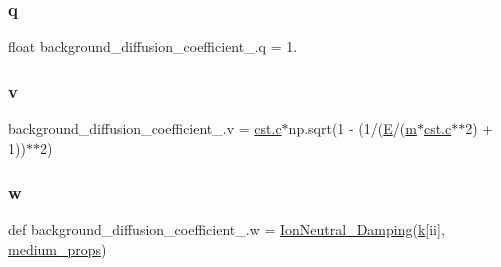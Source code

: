 \mbox{\label{namespacebackground__diffusion__coefficient__2_a7bd6101496be3edb3360a74d65a9798f}} 
\subsubsection{\texorpdfstring{q}{q}}
{\footnotesize\ttfamily float background\+\_\+diffusion\+\_\+coefficient\+\_.\+q = 1.}

\mbox{\label{namespacebackground__diffusion__coefficient__2_a154af3df854c757afad8e3f28b2fc75f}} 
\subsubsection{\texorpdfstring{v}{v}}
{\footnotesize\ttfamily background\+\_\+diffusion\+\_\+coefficient\+\_.\+v = \hyperlink{constants_8h_a8fc6defe4e499b1b9b9c275689e44352}{cst.\+c}$\ast$np.\+sqrt(1 -\/ (1/(\hyperlink{namespacebackground__diffusion__coefficient__2_aa9d61d39948704c32b87737a21272c27}{E}/(\hyperlink{namespacebackground__diffusion__coefficient__2_ab368f7ba91e714aac6f5c675e2a2534f}{m}$\ast$\hyperlink{constants_8h_a8fc6defe4e499b1b9b9c275689e44352}{cst.\+c}$\ast$$\ast$2) + 1))$\ast$$\ast$2)}

\mbox{\label{namespacebackground__diffusion__coefficient__2_a5dc52e0e25a32cb9e53766c8d90d4bac}} 
\subsubsection{\texorpdfstring{w}{w}}
{\footnotesize\ttfamily def background\+\_\+diffusion\+\_\+coefficient\+\_.\+w = \hyperlink{namespacebackground__diffusion__coefficient__2_a788d35f99dde8484595c8cda404e4ae3}{Ion\+Neutral\+\_\+\+Damping}(\hyperlink{namespacebackground__diffusion__coefficient__2_a5a09d109413176dd193dca9b7a470f60}{k}\mbox{[}ii\mbox{]}, \hyperlink{namespacebackground__diffusion__coefficient__2_aa9379babe1c7668f0292249401d84e24}{medium\+\_\+props})}

